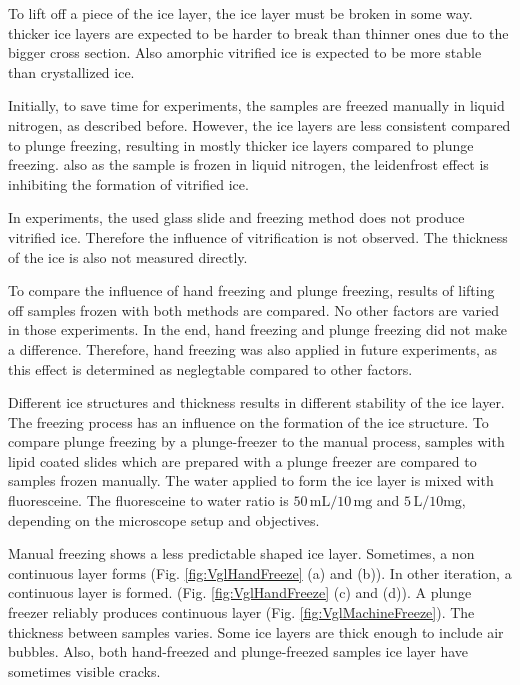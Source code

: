 To lift off a piece of the ice layer, the ice layer must be broken in some way. thicker ice layers are expected to be harder to break than thinner ones due to the bigger cross section. Also amorphic vitrified ice is expected to be more stable than crystallized ice.

Initially, to save time for experiments, the samples are freezed manually in liquid nitrogen, as described before. However, the ice layers are less consistent compared to plunge freezing, resulting in mostly thicker ice layers compared to plunge freezing. also as the sample is frozen in liquid nitrogen, the leidenfrost effect is inhibiting the formation of vitrified ice.

In experiments, the used glass slide and freezing method does not produce vitrified ice. Therefore the influence of vitrification is not observed. The thickness of the ice is also not measured directly. 

To compare the influence of hand freezing and plunge freezing, results of lifting off samples frozen with both methods are compared. No other factors are varied in those experiments. In the end, hand freezing and plunge freezing did not make a difference. Therefore, hand freezing was also applied in future experiments, as this effect is determined as neglegtable compared to other factors.

Different ice structures and thickness results in different stability of the ice layer. The freezing process has an influence on the formation of the ice structure. To compare plunge freezing by a plunge-freezer to the manual process, samples with lipid coated slides which are prepared with a plunge freezer are compared to samples frozen manually. The water applied to form the ice layer is mixed with fluoresceine. The fluoresceine to water ratio is $50\,\si{\milli\liter}/10\,\si{\milli\gram}$ and $5\,\si{\liter}/10\si{\milli\gram}$, depending on the microscope setup and objectives.

Manual freezing shows a less predictable shaped ice layer. Sometimes, a non continuous layer forms (Fig. \ref{fig:VglHandFreeze} (a) and (b)). In other iteration, a continuous layer is formed. (Fig. \ref{fig:VglHandFreeze} (c) and (d)). A plunge freezer reliably produces continuous layer (Fig. \ref{fig:VglMachineFreeze}). The thickness between samples varies. Some ice layers are thick enough to include air bubbles. Also, both hand-freezed and plunge-freezed samples ice layer have sometimes visible cracks.

